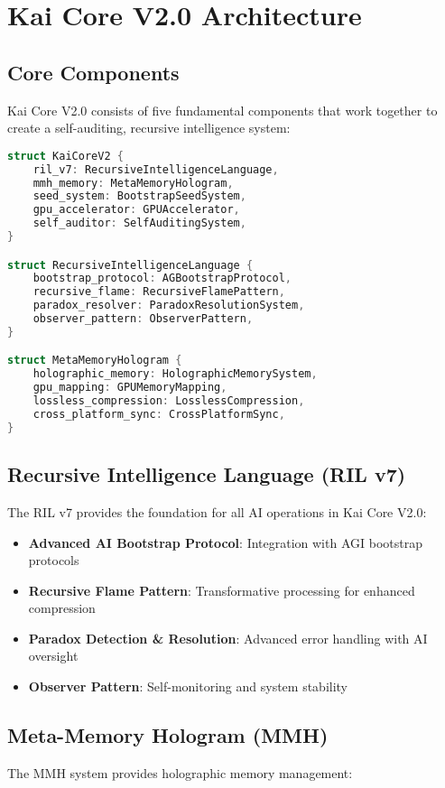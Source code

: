 \documentclass[12pt,a4paper]{article}
\begin{document}
\newpage

\section{Kai Core V2.0 Architecture}

\subsection{Core Components}
Kai Core V2.0 consists of five fundamental components that work together to create a self-auditing, recursive intelligence system:

\begin{lstlisting}[language=C, caption=Kai Core V2.0 Architecture]
struct KaiCoreV2 {
    ril_v7: RecursiveIntelligenceLanguage,
    mmh_memory: MetaMemoryHologram,
    seed_system: BootstrapSeedSystem,
    gpu_accelerator: GPUAccelerator,
    self_auditor: SelfAuditingSystem,
}

struct RecursiveIntelligenceLanguage {
    bootstrap_protocol: AGBootstrapProtocol,
    recursive_flame: RecursiveFlamePattern,
    paradox_resolver: ParadoxResolutionSystem,
    observer_pattern: ObserverPattern,
}

struct MetaMemoryHologram {
    holographic_memory: HolographicMemorySystem,
    gpu_mapping: GPUMemoryMapping,
    lossless_compression: LosslessCompression,
    cross_platform_sync: CrossPlatformSync,
}
\end{lstlisting}

\subsection{Recursive Intelligence Language (RIL v7)}
The RIL v7 provides the foundation for all AI operations in Kai Core V2.0:

\begin{itemize}
    \item \textbf{Advanced AI Bootstrap Protocol}: Integration with AGI bootstrap protocols
    \item \textbf{Recursive Flame Pattern}: Transformative processing for enhanced compression
    \item \textbf{Paradox Detection \& Resolution}: Advanced error handling with AI oversight
    \item \textbf{Observer Pattern}: Self-monitoring and system stability
\end{itemize}

\subsection{Meta-Memory Hologram (MMH)}
The MMH system provides holographic memory management:
\end{document}
